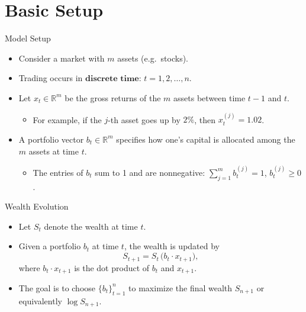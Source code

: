 \documentclass{beamer}
\begin{document}
\section{Basic Setup}
\begin{frame}{Model Setup}
  \begin{itemize}
    \item Consider a market with \(m\) assets (e.g.\ stocks).
    \item Trading occurs in \(\textbf{discrete time}\): \(t = 1, 2, \ldots, n\).
    \item Let \(x_{t} \in \mathbb{R}^m\) be the gross returns of the \(m\) assets between time \(t-1\) and \(t\).
      \begin{itemize}
        \item For example, if the \(j\)-th asset goes up by \(2\%\), then \(x_{t}^{(j)} = 1.02\).
      \end{itemize}
    \item A portfolio vector \(b_t \in \mathbb{R}^m\) specifies how one’s capital is allocated among the \(m\) assets at time \(t\).
      \begin{itemize}
        \item The entries of \(b_t\) sum to 1 and are nonnegative: \(\sum_{j=1}^m b_t^{(j)} = 1\), \(b_t^{(j)} \ge 0\).
      \end{itemize}
  \end{itemize}
\end{frame}

\begin{frame}{Wealth Evolution}
  \begin{itemize}
    \item Let \(S_t\) denote the wealth at time \(t\).
    \item Given a portfolio \(b_t\) at time \(t\), the wealth is updated by
      \[
        S_{t+1} = S_t \, \bigl( b_t \cdot x_{t+1} \bigr),
      \]
      where \(b_t \cdot x_{t+1}\) is the dot product of \(b_t\) and \(x_{t+1}\).
    \item The goal is to choose \(\{b_t\}_{t=1}^n\) to maximize the final wealth \(S_{n+1}\) or equivalently 
          \(\log S_{n+1}\).
  \end{itemize}
\end{frame}

\end{document}
